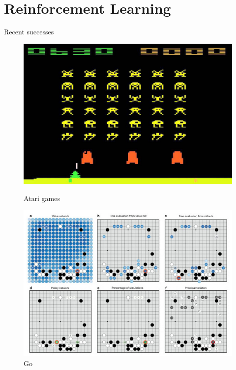\documentclass{beamer}
\begin{document}
\section{Reinforcement Learning}

\begin{frame}{Recent successes}

\begin{figure}
    \centering
    \begin{minipage}{0.45\textwidth}
        \centering
        \includegraphics[width=0.87\linewidth]{../gfx/space_invaders.jpg}
        \caption{Atari games}
    \end{minipage}\hfill
    \begin{minipage}{0.45\textwidth}
        \centering
        \includegraphics[width=\linewidth]{../gfx/alphago.jpg}
        \caption{Go}
    \end{minipage}
\end{figure}

\end{frame}
\end{document}
